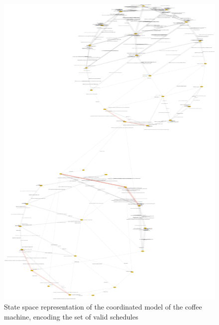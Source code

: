 \begin{figure}[h]
	\begin{center}
		\includegraphics[width=.8\textwidth]{bcool/figs/statespace}
		\caption{State space representation of the coordinated model of the coffee machine, encoding the set of valid schedules}
		\label{fig:statespace}
	\end{center}
\end{figure}

	

